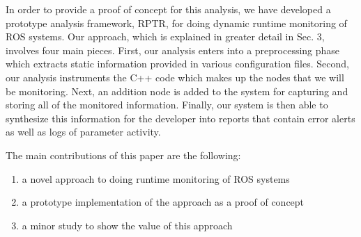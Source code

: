 In order to provide a proof of concept for this analysis, we have developed a prototype analysis framework, RPTR, for doing dynamic runtime monitoring of ROS systems. Our approach, which is explained in greater detail in Sec. 3, involves four main pieces. First, our analysis enters into a preprocessing phase which extracts static information provided in various configuration files. Second, our analysis instruments the C++ code which makes up the nodes that we will be monitoring. Next, an addition node is added to the system for capturing and storing all of the monitored information. Finally, our system is then able to synthesize this information for the developer into reports that contain error alerts as well as logs of parameter activity.

The main contributions of this paper are the following:
\begin{enumerate}
	\item a novel approach to doing runtime monitoring of ROS systems
	\item a prototype implementation of the approach as a proof of concept
	\item a minor study to show the value of this approach
\end{enumerate}
